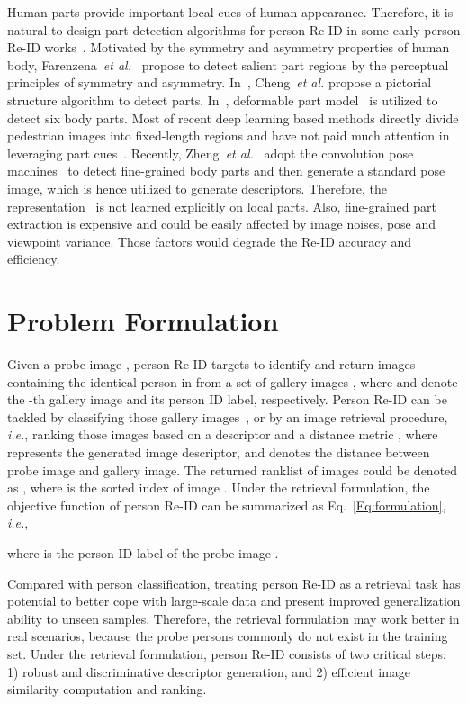 \documentclass[sigconf]{acmart}
\begin{document}
Human parts provide important local cues of human appearance. Therefore, it is natural to design part detection algorithms for person Re-ID in some early person Re-ID works~\cite{farenzena2010person, cheng2014person, bedagkar2012part}. Motivated by the symmetry and asymmetry properties of human body, Farenzena~\emph{et al.}~\cite{farenzena2010person} propose to detect salient part regions by the perceptual principles of symmetry and asymmetry. In~\cite{cheng2014person}, Cheng~\emph{et al.} propose a pictorial structure algorithm to detect parts. In~\cite{bedagkar2012part}, deformable part model~\cite{f2008} is utilized to detect six body parts. Most of recent deep learning based methods directly divide pedestrian images into fixed-length regions and have not paid much attention in leveraging part cues~\cite{li2014deepreid}. Recently, Zheng~\emph{et al.}~\cite{zheng2017pose} adopt the convolution pose machines~\cite{wei2016convolutional} to detect fine-grained body parts and then generate a standard pose image, which is hence utilized to generate descriptors. Therefore, the representation~\cite{zheng2017pose} is not learned explicitly on local parts. Also, fine-grained part extraction is expensive and could be easily affected by image noises, pose and viewpoint variance. Those factors would degrade the Re-ID accuracy and efficiency.


\section{Problem Formulation}

Given a probe image , person Re-ID targets to identify and return images containing the identical person in  from a set of gallery images , where  and  denote the -th gallery image and its person ID label, respectively. Person Re-ID can be tackled by classifying those gallery images~\cite{zheng2016discriminatively, wu2016personnet, wu2016enhanced, su2016deep}, or by an image retrieval procedure, \emph{i.e.}, ranking those images based on a descriptor and a distance metric , where  represents the generated image descriptor, and  denotes the distance between probe image and gallery image. The returned ranklist of  images could be denoted as , where  is the sorted index of image . Under the retrieval formulation, the objective function of person Re-ID can be summarized as Eq.~\eqref{Eq:formulation},\emph{ i.e.},

where  is the person ID label of the probe image .

Compared with person classification, treating person Re-ID as a retrieval task has potential to better cope with large-scale data and present improved generalization ability to unseen samples. Therefore, the retrieval formulation may work better in real scenarios, because the probe persons commonly do not exist in the training set. Under the retrieval formulation, person Re-ID consists of two critical steps: 1) robust and discriminative descriptor generation, and 2) efficient image similarity computation and ranking.
\end{document}
